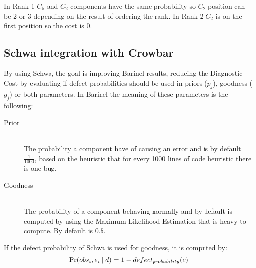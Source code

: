 In Rank 1 \(C_5\) and \(C_2\) components have the same probability so \(C_2\)
position can be 2 or 3 depending on the result of ordering the rank. In Rank 2
\(C_2\)  is on the first position so the cost is 0.

\subsection{Schwa integration with Crowbar}
By using Schwa, the goal is improving Barinel results, reducing the Diagnostic
Cost by evaluating if defect probabilities should be used in priors ($p_j$),
goodness ($g_j$) or both parameters. In Barinel the meaning of these parameters
is the following:

\begin{description}
\item[Prior] \hfill \\
The probability a component have of causing an error and is by default
\( \frac{1}{1000} \), based on the heuristic that for every 1000 lines of code
heuristic there is one bug.
\item[Goodness] \hfill \\
The probability of a component behaving normally and by default is computed by
using the Maximum Likelihood Estimation that is heavy to compute. By default is $0.5$.
\end{description}

If the defect probability of Schwa is used for goodness, it is computed by:
\begin{equation}
\mbox{Pr}(obs_i,e_i \mid d) = 1 - defect_{probability}(c)
\end{equation}
